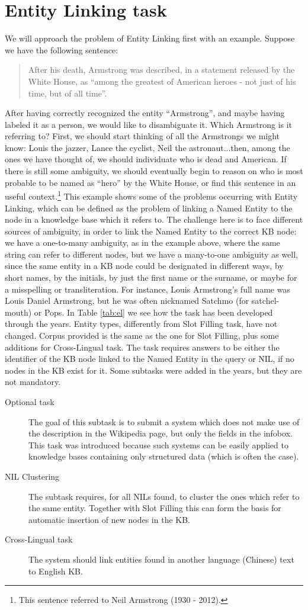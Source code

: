 \documentclass[a4paper,11pt]{report}
\begin{document}
\section{Entity Linking task}
We will approach the problem of Entity Linking first with an example.
Suppose we have the following sentence:
\begin{quote}
After his death, Armstrong was described, in a statement released by the White House, as ``among the greatest of American heroes - not just of his time, but of all time''.
\end{quote}
After having correctly recognized the entity ``Armstrong'', and maybe having labeled it as a person, we would like to disambiguate it. Which Armstrong is it referring to? First, we should start thinking of all the Armstrongs we might know: Louis the jazzer, Lance the cyclist, Neil the astronaut...then, among the ones we have thought of, we should individuate who is dead and American. If there is still some ambiguity, we should eventually begin to reason on who is most probable to be named as ``hero'' by the White House, or find this sentence in an useful context.\footnote{This sentence referred to Neil Armstrong (1930 - 2012).}
This example shows some of the problems occurring with Entity Linking, which can be defined as the problem of linking a Named Entity to the node in a knowledge base which it refers to. The challenge here is to face different sources of ambiguity, in order to link the Named Entity to the correct KB node: we have a one-to-many ambiguity, as in the example above, where the same string can refer to different nodes, but we have a many-to-one ambiguity as well, since the same entity in a KB node could be designated in different ways, by short names, by the initials, by just the first name or the surname, or maybe for a misspelling or transliteration. For instance, Louis Armstrong's full name was Louis Daniel Armstrong, but he was often nicknamed Satchmo (for satchel-mouth) or Pops.
In Table \ref{tab:el} we see how the task has been developed through the years. Entity types, differently from Slot Filling task, have not changed. Corpus provided is the same as the one for Slot Filling, plus some additions for Cross-Lingual task. The task requires answers to be either the identifier of the KB node linked to the Named Entity in the query or NIL, if no nodes in the KB exist for it.
Some subtasks were added in the years, but they are not mandatory.
\begin{description}
\item[Optional task] The goal of this subtask is to submit a system which does not make use of the description in the Wikipedia page, but only the fields in the infobox. This task was introduced because such systems can be easily applied to knowledge bases containing only structured data (which is often the case).
\item[NIL Clustering] The subtask requires, for all NILs found, to cluster the ones which refer to the same entity. Together with Slot Filling this can form the basis for automatic insertion of new nodes in the KB.
\item[Cross-Lingual task] The system should link entities found in another language (Chinese) text to English KB.
\end{description}
\end{document}
